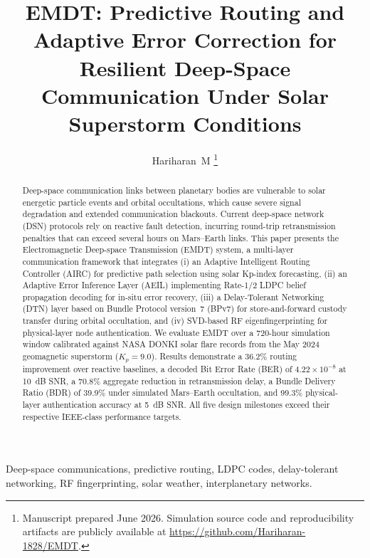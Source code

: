 \documentclass[journal]{IEEEtran}
\begin{document}
\title{EMDT: Predictive Routing and Adaptive Error Correction for Resilient Deep-Space Communication Under Solar Superstorm Conditions}

\author{Hariharan~M%
\thanks{Manuscript prepared June 2026. Simulation source code and reproducibility artifacts are publicly available at \url{https://github.com/Hariharan-1828/EMDT}.}%
}

\maketitle


\begin{abstract}
Deep-space communication links between planetary bodies are vulnerable to solar energetic particle events and orbital occultations, which cause severe signal degradation and extended communication blackouts.
Current deep-space network (DSN) protocols rely on reactive fault detection, incurring round-trip retransmission penalties that can exceed several hours on Mars--Earth links.
This paper presents the Electromagnetic Deep-space Transmission (EMDT) system, a multi-layer communication framework that integrates (i) an Adaptive Intelligent Routing Controller (AIRC) for predictive path selection using solar Kp-index forecasting, (ii) an Adaptive Error Inference Layer (AEIL) implementing Rate-1/2 LDPC belief propagation decoding for in-situ error recovery, (iii) a Delay-Tolerant Networking (DTN) layer based on Bundle Protocol version~7 (BPv7) for store-and-forward custody transfer during orbital occultation, and (iv) SVD-based RF eigenfingerprinting for physical-layer node authentication.
We evaluate EMDT over a 720-hour simulation window calibrated against NASA DONKI solar flare records from the May 2024 geomagnetic superstorm ($K_p = 9.0$).
Results demonstrate a 36.2\% routing improvement over reactive baselines, a decoded Bit Error Rate (BER) of $4.22 \times 10^{-8}$ at 10~dB SNR, a 70.8\% aggregate reduction in retransmission delay, a Bundle Delivery Ratio (BDR) of 39.9\% under simulated Mars--Earth occultation, and 99.3\% physical-layer authentication accuracy at 5~dB SNR.
All five design milestones exceed their respective IEEE-class performance targets.
\end{abstract}

\begin{IEEEkeywords}
Deep-space communications, predictive routing, LDPC codes, delay-tolerant networking, RF fingerprinting, solar weather, interplanetary networks.
\end{IEEEkeywords}
\end{document}
